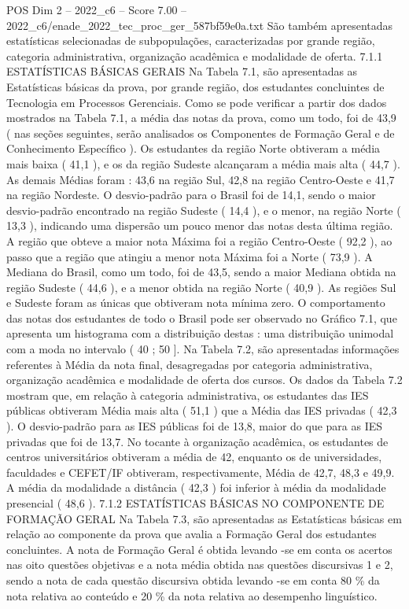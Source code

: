 \begin{textsample}{POS Dim 2 – 2022\_c6 – Score 7.00 – 2022\_c6/enade\_2022\_tec\_proc\_ger\_587bf59e0a.txt}
São também apresentadas estatísticas selecionadas de subpopulações, caracterizadas por grande região, categoria administrativa, organização acadêmica e modalidade de oferta. 7.1.1 ESTATÍSTICAS BÁSICAS GERAIS Na Tabela 7.1, são apresentadas as Estatísticas básicas da prova, por grande região, dos estudantes concluintes de Tecnologia em Processos Gerenciais.
Como se pode verificar a partir dos dados mostrados na Tabela 7.1, a média das notas da prova, como um todo, foi de 43,9 ( nas seções seguintes, serão analisados os Componentes de Formação Geral e de Conhecimento Específico ).
Os estudantes da região Norte obtiveram a média mais baixa ( 41,1 ), e os da região Sudeste alcançaram a média mais alta ( 44,7 ).
As demais Médias foram : 43,6 na região Sul, 42,8 na região Centro-Oeste e 41,7 na região Nordeste.
O desvio-padrão para o Brasil foi de 14,1, sendo o maior desvio-padrão encontrado na região Sudeste ( 14,4 ), e o menor, na região Norte ( 13,3 ), indicando uma dispersão um pouco menor das notas desta última região.
A região que obteve a maior nota Máxima foi a região Centro-Oeste ( 92,2 ), ao passo que a região que atingiu a menor nota Máxima foi a Norte ( 73,9 ).
A Mediana do Brasil, como um todo, foi de 43,5, sendo a maior Mediana obtida na região Sudeste ( 44,6 ), e a menor obtida na região Norte ( 40,9 ).
As regiões Sul e Sudeste foram as únicas que obtiveram nota mínima zero.
O comportamento das notas dos estudantes de todo o Brasil pode ser observado no Gráfico 7.1, que apresenta um histograma com a distribuição destas : uma distribuição unimodal com a moda no intervalo ( 40 ; 50 ].
Na Tabela 7.2, são apresentadas informações referentes à Média da nota final, desagregadas por categoria administrativa, organização acadêmica e modalidade de oferta dos cursos.
Os dados da Tabela 7.2 mostram que, em relação à categoria administrativa, os estudantes das IES públicas obtiveram Média mais alta ( 51,1 ) que a Média das IES privadas ( 42,3 ).
O desvio-padrão para as IES públicas foi de 13,8, maior do que para as IES privadas que foi de 13,7.
No tocante à organização acadêmica, os estudantes de centros universitários obtiveram a média de 42, enquanto os de universidades, faculdades e CEFET/IF obtiveram, respectivamente, Média de 42,7, 48,3 e 49,9.
A média da modalidade a distância ( 42,3 ) foi inferior à média da modalidade presencial ( 48,6 ). 7.1.2 ESTATÍSTICAS BÁSICAS NO COMPONENTE DE FORMAÇÃO GERAL Na Tabela 7.3, são apresentadas as Estatísticas básicas em relação ao componente da prova que avalia a Formação Geral dos estudantes concluintes.
A nota de Formação Geral é obtida levando -se em conta os acertos nas oito questões objetivas e a nota média obtida nas questões discursivas 1 e 2, sendo a nota de cada questão discursiva obtida levando -se em conta 80 \% da nota relativa ao conteúdo e 20 \% da nota relativa ao desempenho linguístico.

\end{textsample}
